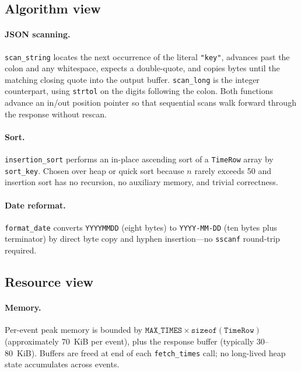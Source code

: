 \documentclass[12pt]{article}
\newcommand{\code}[1]{\texttt{#1}}
\begin{document}
\begin{description}[style=nextline]
\subsection{Algorithm view}

\paragraph{JSON scanning.}
\code{scan\_string} locates the next occurrence of the literal
\code{"key"}, advances past the colon and any whitespace, expects
a double-quote, and copies bytes until the matching closing quote
into the output buffer.  \code{scan\_long} is the integer
counterpart, using \code{strtol} on the digits following the colon.
Both functions advance an in/out position pointer so that
sequential scans walk forward through the response without rescan.

\paragraph{Sort.}
\code{insertion\_sort} performs an in-place ascending sort of a
\code{TimeRow} array by \code{sort\_key}.  Chosen over heap or
quick sort because $n$ rarely exceeds 50 and insertion sort has
no recursion, no auxiliary memory, and trivial correctness.

\paragraph{Date reformat.}
\code{format\_date} converts \code{YYYYMMDD} (eight bytes) to
\code{YYYY-MM-DD} (ten bytes plus terminator) by direct byte
copy and hyphen insertion---no \code{sscanf} round-trip required.

\subsection{Resource view}

\paragraph{Memory.}
Per-event peak memory is bounded by
$\code{MAX\_TIMES} \times \mathtt{sizeof}(\code{TimeRow})$
(approximately 70~KiB per event), plus the response buffer
(typically 30--80~KiB).  Buffers are freed at end of each
\code{fetch\_times} call; no long-lived heap state accumulates
across events.


\end{description}
\end{document}

